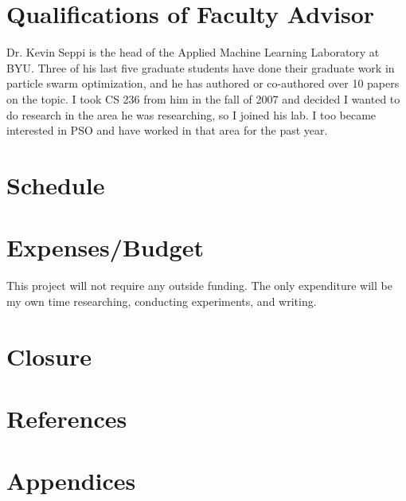 \documentclass[onecolumn, 12pt]{article}
\begin{document}
\section{Qualifications of Faculty Advisor}

Dr. Kevin Seppi is the head of the Applied Machine Learning Laboratory at BYU.
Three of his last five graduate students have done their graduate work in
particle swarm optimization, and he has authored or co-authored over 10 papers
on the topic.  I took CS 236 from him in the fall of 2007 and decided I wanted
to do research in the area he was researching, so I joined his lab.  I too
became interested in PSO and have worked in that area for the past year.

\section{Schedule}

\section{Expenses/Budget}

This project will not require any outside funding.  The only expenditure
will be my own time researching, conducting experiments, and writing.

\section{Closure}

\section{References}

\section{Appendices}
\end{document}
